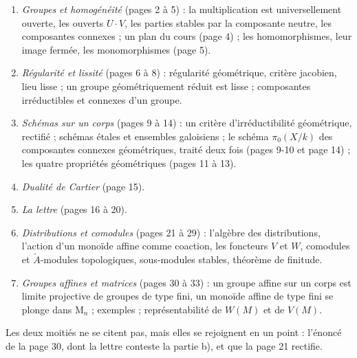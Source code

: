 \documentclass[11pt,a4paper]{article}
\begin{document}
\begin{enumerate}
\item[1.] \emph{Groupes et homogénéité} (pages 2 à 5) : la multiplication est
universellement ouverte, les ouverts $U \cdot V$, les parties stables par la
composante neutre, les composantes connexes ; un plan du cours (page 4) ;
les homomorphismes, leur image fermée, les monomorphismes (page 5).
\item[2.] \emph{Régularité et lissité} (pages 6 à 8) : régularité
géométrique, critère jacobien, lieu lisse ; un groupe géométriquement réduit
est lisse ; composantes irréductibles et connexes d'un groupe.
\item[3.] \emph{Schémas sur un corps} (pages 9 à 14) : un critère
d'irréductibilité géométrique, rectifié ; schémas étales et ensembles
galoisiens ; le schéma $\pi_{0}(X/k)$ des composantes connexes géométriques,
traité deux fois (pages 9-10 et page 14) ; les quatre propriétés
géométriques (pages 11 à 13).
\item[4.] \emph{Dualité de Cartier} (page 15).
\item[5.] \emph{La lettre} (pages 16 à 20).
\item[6.] \emph{Distributions et comodules} (pages 21 à 29) : l'algèbre des
distributions, l'action d'un monoïde affine comme coaction, les foncteurs
$V$ et $W$, comodules et $\check{A}$-modules topologiques, sous-modules
stables, théorème de finitude.
\item[7.] \emph{Groupes affines et matrices} (pages 30 à 33) : un groupe
affine sur un corps est limite projective de groupes de type fini, un
monoïde affine de type fini se plonge dans $\mathrm{M}_{n}$ ; exemples ;
représentabilité de $W(M)$ et de $V(M)$.
\end{enumerate}

Les deux moitiés ne se citent pas, mais elles se rejoignent en un point :
l'énoncé de la page 30, dont la lettre conteste la partie b), et que la
page 21 rectifie.
\end{document}
